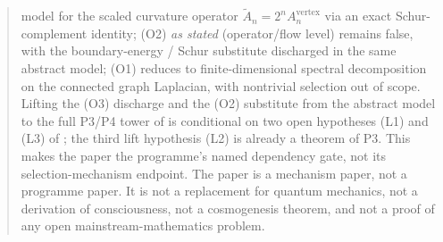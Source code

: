 \documentclass[11pt]{article}
\theoremstyle{definition}
\begin{document}
\begin{abstract}
model for the scaled curvature operator
$\widetilde A_n = 2^n A_n^{\mathrm{vertex}}$ via an exact
Schur-complement identity; (O2) \emph{as stated} (operator/flow
level) remains false, with the boundary-energy / Schur substitute
discharged in the same abstract model; (O1) reduces to
finite-dimensional spectral decomposition on the connected graph
Laplacian, with nontrivial selection out of scope. Lifting the (O3)
discharge and the (O2) substitute from the abstract model to the
full P3/P4 tower of \cite{CascadeRefinementSpaces, CascadeClosureDynamics}
is conditional on two open hypotheses (L1) and (L3) of
\cite[\S\texttt{sec:scope-and-gap}]{CascadeRefinementCompat}; the third lift hypothesis
(L2) is already a theorem of P3. This makes the paper the programme's
named dependency gate, not its selection-mechanism endpoint. The paper is a mechanism
paper, not a programme paper. It is not a replacement for quantum
mechanics, not a derivation of consciousness, not a cosmogenesis
theorem, and not a proof of any open mainstream-mathematics problem.
\end{abstract}
\end{document}
